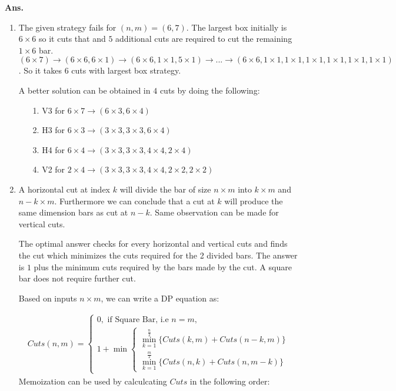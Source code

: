 \documentclass[11pt]{article}
\begin{document}
\noindent \textbf{Ans.}
\begin{enumerate}
\item The given strategy fails for $(n,m) = (6,7)$. The largest box initially is $6\times6$ so it cuts that and $5$ additional cuts are required to cut the remaining $1\times6$ bar.
$(6\times7) \rightarrow (6\times6, 6\times1) \rightarrow  (6\times6, 1\times1, 5\times1) \rightarrow ... \rightarrow (6\times6, 1\times1, 1\times1, 1\times1, 1\times1,1\times1, 1\times1)$. So it takes $6$ cuts with largest box strategy.

A better solution can be obtained in $4$ cuts by doing the following:
\begin{enumerate}
    \item[1.] V3 for $6\times7 \rightarrow (6\times3, 6\times4)$
    \item[2.] H3 for $6\times3 \rightarrow (3\times3,3\times3,6\times4)$
    \item[3.] H4 for $6\times4 \rightarrow (3\times3,3\times3,4\times4,2\times4)$
    \item[4.] V2 for $2\times4 \rightarrow (3\times3,3\times3,4\times4,2\times2,2\times2)$
\end{enumerate}

\item 
A horizontal cut at index $k$ will divide the bar of size $n\times m$ into $k\times m$ and $n-k\times m$. Furthermore we can conclude that a cut at $k$ will produce the same dimension bars as cut at $n-k$. Same observation can be made for vertical cuts.

The optimal answer checks for every horizontal and vertical cuts and finds the cut which minimizes the cuts required for the 2 divided bars. The answer is $1$ plus the minimum cuts required by the bars made by the cut. A square bar does not require further cut.

Based on inputs $n\times m$, we can write a DP equation as:

\begin{equation}
    \begin{split}
       Cuts(n,m) = 
       \begin{cases}
            0, \text{ if Square Bar, i.e } n=m,\\
            1+\min
            \begin{cases}
            \min_{k=1}^{\frac{n}{2}} \{Cuts(k,m) + Cuts(n-k,m)\}\\
            \min_{k=1}^{\frac{m}{2}} \{Cuts(n,k) + Cuts(n,m-k)\}
            \end{cases}
        \end{cases}
    \end{split}
\end{equation}
Memoization can be used by calculcating $Cuts$ in the following order:


\end{enumerate}
\end{document}
